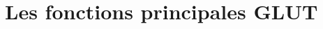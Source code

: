 \documentclass{beamer}
\begin{document}
\section{Les fonctions principales GLUT}

%
%

%
\end{document}
